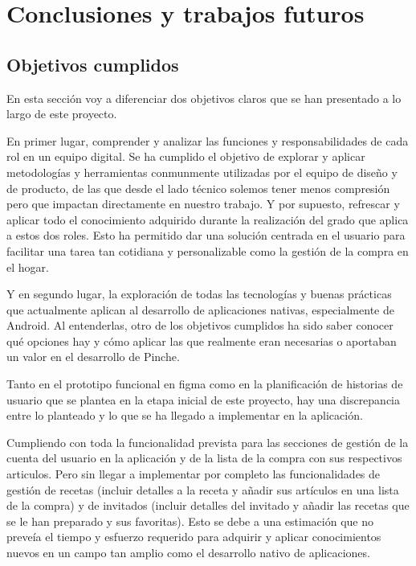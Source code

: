 \cleardoublepage
\chapter{Conclusiones y trabajos futuros}
\label{chap:conclusiones-trabajos-futuros}


\section{Objetivos cumplidos}
\label{sec:objetivos-cumplidos}
En esta sección voy a diferenciar dos objetivos claros que se han presentado a lo largo de este proyecto.

En primer lugar, comprender y analizar las funciones y responsabilidades de cada rol en un equipo digital. Se ha cumplido el objetivo de explorar y aplicar metodologías y herramientas conmunmente utilizadas por el equipo de diseño y de producto, de las que desde el lado técnico solemos tener menos compresión pero que impactan directamente en nuestro trabajo. Y por supuesto, refrescar y aplicar todo el conocimiento adquirido durante la realización del grado que aplica a estos dos roles. Esto ha permitido dar una solución centrada en el usuario para facilitar una tarea tan cotidiana y personalizable como la gestión de la compra en el hogar.

Y en segundo lugar, la exploración de todas las tecnologías y buenas prácticas que actualmente aplican al desarrollo de aplicaciones nativas, especialmente de Android. Al entenderlas, otro de los objetivos cumplidos ha sido saber conocer qué opciones hay y cómo aplicar las que realmente eran necesarias o aportaban un valor en el desarrollo de Pinche.

Tanto en el prototipo funcional en figma como en la planificación de historias de usuario que se plantea en la etapa inicial de este proyecto, hay una discrepancia entre lo planteado y lo que se ha llegado a implementar en la aplicación.

Cumpliendo con toda la funcionalidad prevista para las secciones de gestión de la cuenta del usuario en la aplicación y de la lista de la compra con sus respectivos articulos. Pero sin llegar a implementar por completo las funcionalidades de gestión de recetas (incluir detalles a la receta y añadir sus artículos en una lista de la compra) y de invitados (incluir detalles del invitado y añadir las recetas que se le han preparado y sus favoritas). Esto se debe a una estimación que no preveía el tiempo y esfuerzo requerido para adquirir y aplicar conocimientos nuevos en un campo tan amplio como el desarrollo nativo de aplicaciones.

